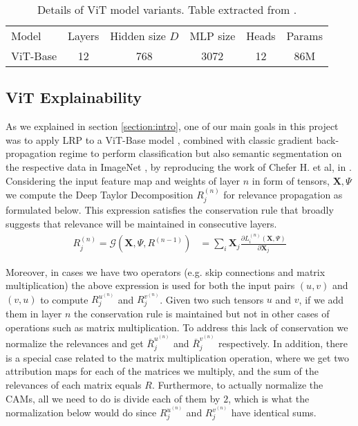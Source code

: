 \begin{table}[]
\begin{tabular}{l c c c c c}
Model            & Layers & Hidden size $D$ & MLP size &  Heads  & Params \\
ViT-Base   &   12   &        768      &   3072   &   12    &   86M  \\
\end{tabular}
\caption{Details of ViT model variants. Table extracted from \cite{visiontransformer}.}
\label{tbl:models}
\end{table}

\subsection{ViT Explainability}
\label{sub:3.2}
As we explained in section \ref{section:intro}, one of our main goals in this project was to apply LRP \cite{renormalizationLRP} to a ViT-Base model \cite{visiontransformer}, combined with classic gradient back-propagation regime to perform classification but also semantic segmentation on the respective data in ImageNet \cite{russakovsky2015ImageNet, imagenet-seg}, by reproducing the work of Chefer H. et al, in \cite{mainpaper}. Considering the input feature map and weights of layer $n$ in form
of tensors, $\mathbf{X}, \Psi$ we compute the Deep Taylor Decomposition $R_j^{(n)}$ for relevance propagation as formulated below. This expression satisfies the conservation rule that broadly suggests that relevance will be maintained in consecutive layers.
\begin{align}
    \nonumber
    R_j^{(n)} = \mathcal{G}\left(\mathbf{X}, \Psi, R^{(n-1)}\right)
    &= \sum_{i} \mathbf{X}_j \frac{\partial L_i^{(n)}(\mathbf{X}, \Psi)}{\partial\textbf{X}_j}
\end{align}

Moreover, in cases we have two operators (e.g. skip connections and matrix multiplication) the above expression is used for both the input pairs $(u, v)$ and $(v, u)$ to compute $R_j^{{u}^{(n)}}$ and $R_j^{{v}^{(n)}}$. Given two such tensors $u$ and $v$, if we add them in layer $n$ the conservation rule is maintained but not in other cases of operations such as matrix multiplication. To address this lack of conservation we normalize the relevances and get $\bar{R}_j^{{u}^{(n)}}$ and $\bar{R}_j^{{v}^{(n)}}$ respectively. In addition, there is a special case related to the matrix multiplication operation, where we get two attribution maps for each of the matrices we multiply, and the sum of the relevances of each matrix equals $R$. Furthermore, to actually normalize the CAMs, all we need to do is divide each of them by $2$, which is what the normalization below would do since $R_j^{{u}^{(n)}}$ and $R_j^{{v}^{(n)}}$  have identical sums.

